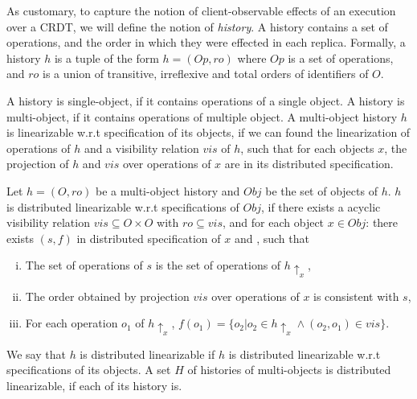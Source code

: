  As customary, to capture the notion of client-observable effects of an execution over a CRDT, we will define the notion of \emph{history}. A history contains a set of operations, and the order in which they were effected in each replica. Formally, a history $h$ is a tuple of the form $h = (Op,\mathit{ro})$ where $Op$ is a set of operations, and $\mathit{ro}$ is a union of transitive, irreflexive and total orders of identifiers of $O$.


A history is single-object, if it contains operations of a single object. A history is multi-object, if it contains operations of multiple object. A multi-object history $h$ is linearizable w.r.t specification of its objects, if we can found the linearization of operations of $h$ and a visibility relation $\mathit{vis}$ of $h$, such that for each objects $x$, the projection of $h$ and $\mathit{vis}$ over operations of $x$ are in its distributed specification.


\begin{definition}
\label{definition:distributed linearizability} 

Let $h = (O,\mathit{ro})$ be a multi-object history and $\mathit{Obj}$ be the set of objects of $h$. $h$ is distributed linearizable w.r.t specifications of $\mathit{Obj}$, if there exists a acyclic visibility relation $\mathit{vis} \subseteq O \times O$ with $\mathit{ro} \subseteq \mathit{vis}$, and for each object $x \in \mathit{Obj}$: there exists $(s,f)$ in distributed specification of $x$ and , such that

\begin{enumerate}[(i)]
\item The set of operations of $s$ is the set of operations of $h \uparrow_{x}$,   
\item The order obtained by projection $\mathit{vis}$ over operations of $x$ is consistent with $s$,
\item For each operation $o_1$ of $h \uparrow_{x}$, $f(o_1) = \{ o_2 \vert o_2 \in h \uparrow_{x} \wedge (o_2,o_1) \in \mathit{vis} \}$. 
\end{enumerate} 

We say that $h$ is distributed linearizable if $h$ is distributed linearizable w.r.t specifications of its objects. A set $H$ of histories of multi-objects is distributed linearizable, if each of its history is. 
\end{definition}


